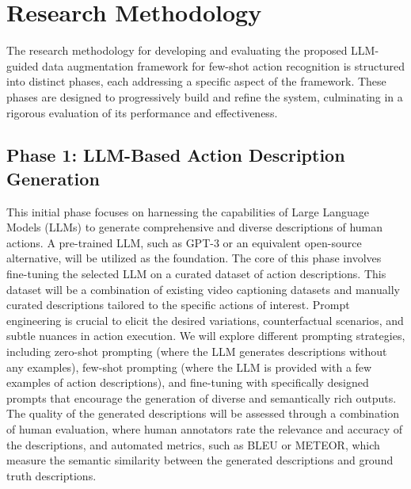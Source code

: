 \section*{Research Methodology}

The research methodology for developing and evaluating the proposed LLM-guided data augmentation framework for few-shot action recognition is structured into distinct phases, each addressing a specific aspect of the framework. These phases are designed to progressively build and refine the system, culminating in a rigorous evaluation of its performance and effectiveness.


\subsection*{Phase 1: LLM-Based Action Description Generation}
This initial phase focuses on harnessing the capabilities of Large Language Models (LLMs) to generate comprehensive and diverse descriptions of human actions. A pre-trained LLM, such as GPT-3 or an equivalent open-source alternative, will be utilized as the foundation. The core of this phase involves fine-tuning the selected LLM on a curated dataset of action descriptions. This dataset will be a combination of existing video captioning datasets and manually curated descriptions tailored to the specific actions of interest. Prompt engineering is crucial to elicit the desired variations, counterfactual scenarios, and subtle nuances in action execution. We will explore different prompting strategies, including zero-shot prompting (where the LLM generates descriptions without any examples), few-shot prompting (where the LLM is provided with a few examples of action descriptions), and fine-tuning with specifically designed prompts that encourage the generation of diverse and semantically rich outputs. The quality of the generated descriptions will be assessed through a combination of human evaluation, where human annotators rate the relevance and accuracy of the descriptions, and automated metrics, such as BLEU or METEOR, which measure the semantic similarity between the generated descriptions and ground truth descriptions.

